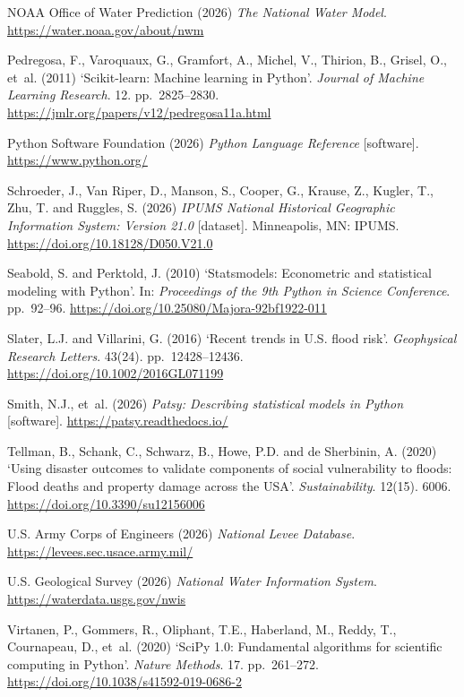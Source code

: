 \documentclass[10pt,twocolumn]{article}
\begin{document}
\begin{thebibliography}{}
NOAA Office of Water Prediction (2026)
\textit{The National Water Model}. \url{https://water.noaa.gov/about/nwm}

Pedregosa, F., Varoquaux, G., Gramfort, A., Michel, V., Thirion, B., Grisel, O., et~al. (2011)
`Scikit-learn: Machine learning in Python'.
\textit{Journal of Machine Learning Research}. 12. pp.~2825--2830. \url{https://jmlr.org/papers/v12/pedregosa11a.html}

Python Software Foundation (2026)
\textit{Python Language Reference} [software]. \url{https://www.python.org/}

Schroeder, J., Van Riper, D., Manson, S., Cooper, G., Krause, Z., Kugler, T., Zhu, T. and
Ruggles, S. (2026)
\textit{IPUMS National Historical Geographic Information System: Version 21.0} [dataset].
Minneapolis, MN: IPUMS. \url{https://doi.org/10.18128/D050.V21.0}

Seabold, S. and Perktold, J. (2010)
`Statsmodels: Econometric and statistical modeling with Python'.
In: \textit{Proceedings of the 9th Python in Science Conference}. pp.~92--96.
\url{https://doi.org/10.25080/Majora-92bf1922-011}

Slater, L.J. and Villarini, G. (2016)
`Recent trends in U.S. flood risk'.
\textit{Geophysical Research Letters}. 43(24). pp.~12428--12436. \url{https://doi.org/10.1002/2016GL071199}

Smith, N.J., et~al. (2026)
\textit{Patsy: Describing statistical models in Python} [software]. \url{https://patsy.readthedocs.io/}

Tellman, B., Schank, C., Schwarz, B., Howe, P.D. and de Sherbinin, A. (2020)
`Using disaster outcomes to validate components of social vulnerability to floods: Flood deaths and property damage across the USA'.
\textit{Sustainability}. 12(15). 6006. \url{https://doi.org/10.3390/su12156006}

U.S. Army Corps of Engineers (2026)
\textit{National Levee Database}. \url{https://levees.sec.usace.army.mil/}

U.S. Geological Survey (2026)
\textit{National Water Information System}. \url{https://waterdata.usgs.gov/nwis}

Virtanen, P., Gommers, R., Oliphant, T.E., Haberland, M., Reddy, T., Cournapeau, D., et~al. (2020)
`SciPy 1.0: Fundamental algorithms for scientific computing in Python'.
\textit{Nature Methods}. 17. pp.~261--272. \url{https://doi.org/10.1038/s41592-019-0686-2}

\end{thebibliography}
\end{document}
